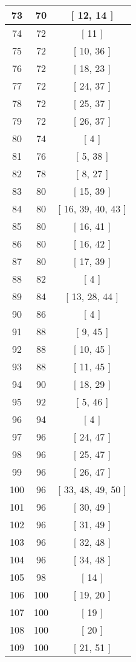 \begin{center}
\begin{longtable}[H]{|| c c c ||}
73 & 70 & [ 12, 14 ] \\ 
\hline
74 & 72 & [ 11 ] \\ 
\hline
75 & 72 & [ 10, 36 ] \\ 
\hline
76 & 72 & [ 18, 23 ] \\ 
\hline
77 & 72 & [ 24, 37 ] \\ 
\hline
78 & 72 & [ 25, 37 ] \\ 
\hline
79 & 72 & [ 26, 37 ] \\ 
\hline
80 & 74 & [ 4 ] \\ 
\hline
81 & 76 & [ 5, 38 ] \\ 
\hline
82 & 78 & [ 8, 27 ] \\ 
\hline
83 & 80 & [ 15, 39 ] \\ 
\hline
84 & 80 & [ 16, 39, 40, 43 ] \\ 
\hline
85 & 80 & [ 16, 41 ] \\ 
\hline
86 & 80 & [ 16, 42 ] \\ 
\hline
87 & 80 & [ 17, 39 ] \\ 
\hline
88 & 82 & [ 4 ] \\ 
\hline
89 & 84 & [ 13, 28, 44 ] \\ 
\hline
90 & 86 & [ 4 ] \\ 
\hline
91 & 88 & [ 9, 45 ] \\ 
\hline
92 & 88 & [ 10, 45 ] \\ 
\hline
93 & 88 & [ 11, 45 ] \\ 
\hline
94 & 90 & [ 18, 29 ] \\ 
\hline
95 & 92 & [ 5, 46 ] \\ 
\hline
96 & 94 & [ 4 ] \\ 
\hline
97 & 96 & [ 24, 47 ] \\ 
\hline
98 & 96 & [ 25, 47 ] \\ 
\hline
99 & 96 & [ 26, 47 ] \\ 
\hline
100 & 96 & [ 33, 48, 49, 50 ] \\ 
\hline
101 & 96 & [ 30, 49 ] \\ 
\hline
102 & 96 & [ 31, 49 ] \\ 
\hline
103 & 96 & [ 32, 48 ] \\ 
\hline
104 & 96 & [ 34, 48 ] \\ 
\hline
105 & 98 & [ 14 ] \\ 
\hline
106 & 100 & [ 19, 20 ] \\ 
\hline
107 & 100 & [ 19 ] \\ 
\hline
108 & 100 & [ 20 ] \\ 
\hline
109 & 100 & [ 21, 51 ] \\ 

\end{longtable}
\end{center}
